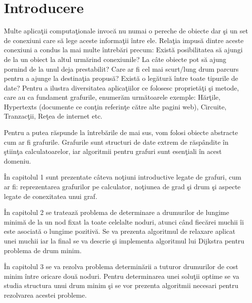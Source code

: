 \documentclass[11pt,a4paper]{report}
\begin{document}
	
	\thispagestyle{empty}
	\tableofcontents
	\thispagestyle{empty}
	\fancyhf{}
		\clearpage

	
	\chapter*{Introducere}
	Multe aplica\c tii computa\c tionale invoc\u a nu numai o pereche de obiecte dar \c si un set de conexiuni care s\u a lege aceste informa\c tii \^intre ele. Rela\c tia impus\u a dintre aceste conexiuni a condus la mai multe \^intreb\u ari precum: Exist\u a posibilitatea s\u a ajungi de la un obiect la altul urm\u arind conexiunile? La c\^ ate obiecte pot s\u a ajung pornind de la unul deja prestabilit? Care ar fi cel mai scurt/lung drum parcurs pentru a ajunge la destina\c tia propus\u a? Exist\u a o leg\u atur\u a \^ intre toate tipurile de date? Pentru a ilustra diversitatea aplica\c tiilor ce folosesc propriet\u a\c ti \c si metode, care au ca fundament grafurile, enumer\u am urm\u atoarele exemple: H\u ar\c tile, Hypertexts (documente ce con\c tin referin\c te c\u atre alte pagini web), Circuite, Tranzac\c tii, Re\c tea de internet etc.
	
	Pentru a putea r\u aspunde la \^ intreb\u arile de mai sus, vom folosi obiecte abstracte cum ar fi grafurile. Grafurile sunt structuri de date extrem de r\u asp\^ andite \^ in \c stiin\c ta calculatoarelor, iar algoritmii pentru grafuri sunt esen\c tiali \^ in acest domeniu.
	
	\^ In capitolul 1 sunt prezentate c\^ ateva no\c tiuni introductive legate de grafuri, cum ar fi: reprezentarea grafurilor pe calculator, no\c tiunea de grad \c si drum  \c si aspecte legate de conexitatea unui graf.
	
	\^ In  capitolul 2 se trateaz\u a problema de   determinare a drumurilor de lungime minim\u a de la un nod fixat la toate celelalte noduri, atunci c\^ and fiec\u arei muchii \^ ii este  asociat\u a o lungime pozitiv\u a. Se va prezenta algoritmul de relaxare aplicat unei muchii iar la final se va descrie \c si implementa algoritmul lui Dijkstra pentru problema de drum minim.
	
	\^ In capitolul 3 se va rezolva problema  determin\u arii a tuturor drumurilor de cost minim \^ intre oricare dou\u a noduri. Pentru determinarea unei solu\c tii optime se va studia structura unui drum minim \c si se vor prezenta  algoritmii necesari pentru rezolvarea acestei probleme.
		
\end{document}
